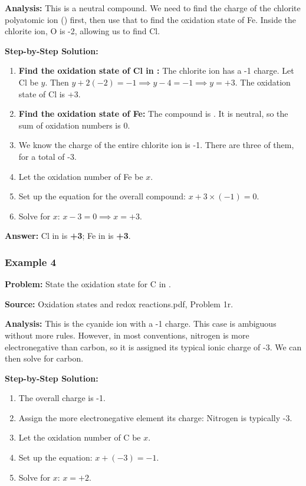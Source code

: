 \documentclass{article}
\begin{document}
\textbf{Analysis:} This is a neutral compound. We need to find the charge of the chlorite polyatomic ion () first, then use that to find the oxidation state of Fe. Inside the chlorite ion, O is -2, allowing us to find Cl.

\textbf{Step-by-Step Solution:}
\begin{enumerate}
    \item \textbf{Find the oxidation state of Cl in :} The chlorite ion has a -1 charge. Let Cl be $y$. Then $y + 2(-2) = -1 \implies y - 4 = -1 \implies y = +3$. The oxidation state of Cl is +3.
    \item \textbf{Find the oxidation state of Fe:} The compound is . It is neutral, so the sum of oxidation numbers is 0.
    \item We know the charge of the entire chlorite ion is -1. There are three of them, for a total of -3.
    \item Let the oxidation number of Fe be $x$.
    \item Set up the equation for the overall compound: $x + 3 \times (-1) = 0$.
    \item Solve for $x$: $x - 3 = 0 \implies x = +3$.
\end{enumerate}

\textbf{Answer:} Cl in  is \textbf{+3}; Fe in  is \textbf{+3}.

\subsubsection{Example 4}
\textbf{Problem:} State the oxidation state for C in .

\textbf{Source:} Oxidation states and redox reactions.pdf, Problem 1r.

\textbf{Analysis:} This is the cyanide ion with a -1 charge. This case is ambiguous without more rules. However, in most conventions, nitrogen is more electronegative than carbon, so it is assigned its typical ionic charge of -3. We can then solve for carbon.

\textbf{Step-by-Step Solution:}
\begin{enumerate}
    \item The overall charge is -1.
    \item Assign the more electronegative element its charge: Nitrogen is typically -3.
    \item Let the oxidation number of C be $x$.
    \item Set up the equation: $x + (-3) = -1$.
    \item Solve for $x$: $x = +2$.
\end{enumerate}
\end{document}
